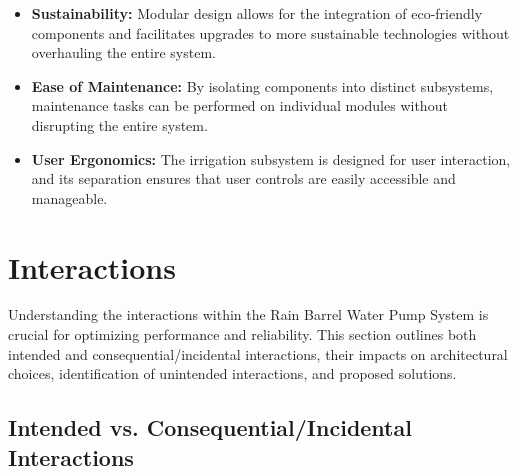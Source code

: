 \documentclass[12pt]{article}
\begin{document}
\begin{itemize}
    \item \textbf{Sustainability:} Modular design allows for the integration of eco-friendly components and facilitates upgrades to more sustainable technologies without overhauling the entire system.
    \item \textbf{Ease of Maintenance:} By isolating components into distinct subsystems, maintenance tasks can be performed on individual modules without disrupting the entire system.
    \item \textbf{User Ergonomics:} The irrigation subsystem is designed for user interaction, and its separation ensures that user controls are easily accessible and manageable.
\end{itemize}

\newpage
\section{Interactions}
\label{sec:interactions}

Understanding the interactions within the Rain Barrel Water Pump System is crucial for optimizing performance and reliability. This section outlines both intended and consequential/incidental interactions, their impacts on architectural choices, identification of unintended interactions, and proposed solutions.

\subsection{Intended vs. Consequential/Incidental Interactions}
\end{document}
